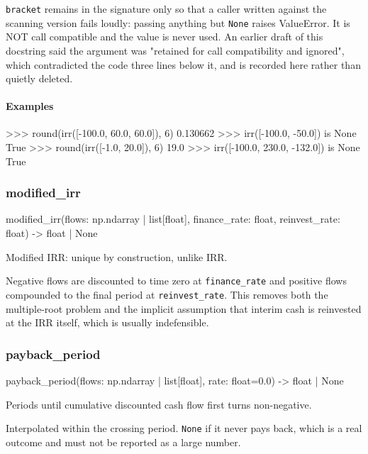 \documentclass[10pt,a4paper,twoside]{report}
\begin{document}
\texttt{bracket} remains in the signature only so that a caller written against the scanning version fails loudly: passing anything but \texttt{None} raises ValueError. It is NOT call compatible and the value is never used. An earlier draft of this docstring said the argument was "retained for call compatibility and ignored", which contradicted the code three lines below it, and is recorded here rather than quietly deleted.

\paragraph*{Examples}

\begin{doctestblock}
>>> round(irr([-100.0, 60.0, 60.0]), 6)
0.130662
>>> irr([-100.0, -50.0]) is None
True
>>> round(irr([-1.0, 20.0]), 6)
19.0
>>> irr([-100.0, 230.0, -132.0]) is None
True
\end{doctestblock}

\subsubsection*{modified\_irr}

\begin{verbatimsmall}
modified_irr(flows: np.ndarray | list[float], finance_rate: float, reinvest_rate: float) -> float | None
\end{verbatimsmall}

Modified IRR: unique by construction, unlike IRR.

Negative flows are discounted to time zero at \texttt{finance\_rate} and positive flows compounded to the final period at \texttt{reinvest\_rate}. This removes both the multiple-root problem and the implicit assumption that interim cash is reinvested at the IRR itself, which is usually indefensible.

\subsubsection*{payback\_period}

\begin{verbatimsmall}
payback_period(flows: np.ndarray | list[float], rate: float=0.0) -> float | None
\end{verbatimsmall}

Periods until cumulative discounted cash flow first turns non-negative.

Interpolated within the crossing period. \texttt{None} if it never pays back, which is a real outcome and must not be reported as a large number.
\end{document}
